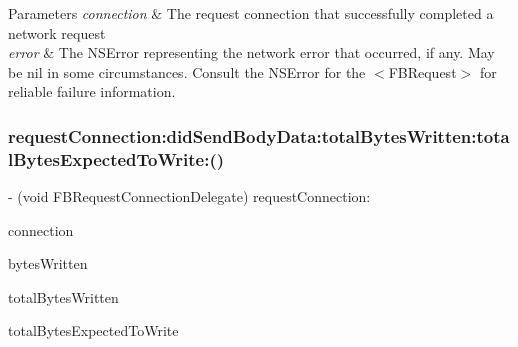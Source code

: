 \begin{DoxyParams}{Parameters}
{\em connection} & The request connection that successfully completed a network request \\
\hline
{\em error} & The {\ttfamily N\+S\+Error} representing the network error that occurred, if any. May be nil in some circumstances. Consult the {\ttfamily N\+S\+Error} for the $<$\+F\+B\+Request$>$ for reliable failure information. \\
\hline
\end{DoxyParams}
\mbox{\label{protocolFBRequestConnectionDelegate_01-p_a84427a6debebcef494f5766d8f70ce16}} 
\subsubsection{\texorpdfstring{request\+Connection\+:did\+Send\+Body\+Data\+:total\+Bytes\+Written\+:total\+Bytes\+Expected\+To\+Write\+:()}{requestConnection:didSendBodyData:totalBytesWritten:totalBytesExpectedToWrite:()}\hspace{0.1cm}{\footnotesize\ttfamily [1/5]}}
{\footnotesize\ttfamily -\/ (void F\+B\+Request\+Connection\+Delegate) request\+Connection\+: \begin{DoxyParamCaption}\item[{(\hyperlink{interfaceFBRequestConnection}{F\+B\+Request\+Connection} $\ast$)}]{connection }\item[{didSendBodyData:(N\+S\+Integer)}]{bytes\+Written }\item[{totalBytesWritten:(N\+S\+Integer)}]{total\+Bytes\+Written }\item[{totalBytesExpectedToWrite:(N\+S\+Integer)}]{total\+Bytes\+Expected\+To\+Write }\end{DoxyParamCaption}\hspace{0.3cm}{\ttfamily [optional]}}


